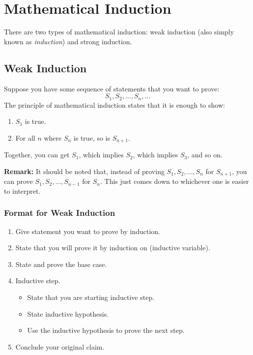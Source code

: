 \documentclass[letterpaper]{article}
\begin{document}
\newpage
{}

\section{Mathematical Induction}
There are two types of mathematical induction: weak induction (also simply known as \emph{induction}) and strong induction. 

\subsection{Weak Induction}
Suppose you have some sequence of statements that you want to prove:
\[ S_1, S_2, \dots, S_n, ...\]
The principle of mathematical induction states that it is enough to show:
\begin{enumerate}
    \item $S_1$ is true.
    \item For all $n$ where $S_n$ is true, so is $S_{n + 1}$. 
\end{enumerate}
Together, you can get $S_1$, which implies $S_2$, which implies $S_3$, and so on. 

\bigskip 

\textbf{Remark:} It should be noted that, instead of proving $S_1, S_2, \dots, S_n$ for $S_{n + 1}$, you can prove $S_1, S_2, \dots, S_{n - 1}$ for $S_n$. This just comes down to whichever one is easier to interpret. 

\subsubsection{Format for Weak Induction}
\begin{enumerate}
    \item Give statement you want to prove by induction. 
    \item State that you will prove it by induction on (inductive variable). 
    \item State and prove the base case.
    \item Inductive step.
    \begin{itemize}
        \item State that you are starting inductive step.
        \item State inductive hypothesis. 
        \item Use the inductive hypothesis to prove the next step.
    \end{itemize}
    \item Conclude your original claim. 
\end{enumerate}
\end{document}
